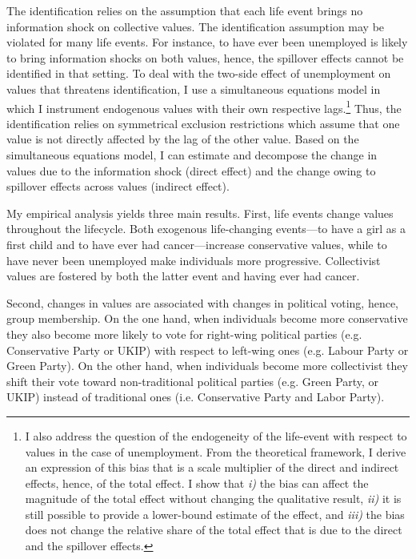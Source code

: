 The identification relies on the assumption that each life event brings no information shock on collective values. The identification assumption may be violated for many life events. For instance, to have ever been unemployed is likely to bring information shocks on both values, hence, the spillover effects cannot be identified in that setting. To deal with the two-side effect of unemployment on values that threatens identification, I use a simultaneous equations model in which I instrument endogenous values with their own respective lags.\footnote{I also address the question of the endogeneity of the life-event with respect to values in the case of unemployment. From the theoretical framework, I derive an expression of this bias that is a scale multiplier of the direct and indirect effects, hence, of the total effect. I show that \textit{i)} the bias can affect the magnitude of the total effect without changing the qualitative result, \textit{ii)} it is still possible to provide a lower-bound estimate of the effect, and \textit{iii)} the bias does not change the relative share of the total effect that is due to the direct and the spillover effects.} Thus, the identification relies on symmetrical exclusion restrictions which assume that one value is not directly affected by the lag of the other value. Based on the simultaneous equations model, I can estimate and decompose the change in values due to the information shock (direct effect) and the change owing to spillover effects across values (indirect effect). 

My empirical analysis yields three main results. First, life events change values throughout the lifecycle. Both exogenous life-changing events---to have a girl as a first child and to have ever had cancer---increase conservative values, while to have never been unemployed make individuals more progressive. Collectivist values are fostered by both the latter event and having ever had cancer.

Second, changes in values are associated with changes in political voting, hence, group membership. On the one hand, when individuals become more conservative they also become more likely to vote for right-wing political parties (e.g. Conservative Party or UKIP) with respect to left-wing ones (e.g. Labour Party or Green Party). On the other hand, when individuals become more collectivist they shift their vote toward non-traditional political parties (e.g. Green Party, or UKIP) instead of traditional ones (i.e. Conservative Party and Labor Party).


